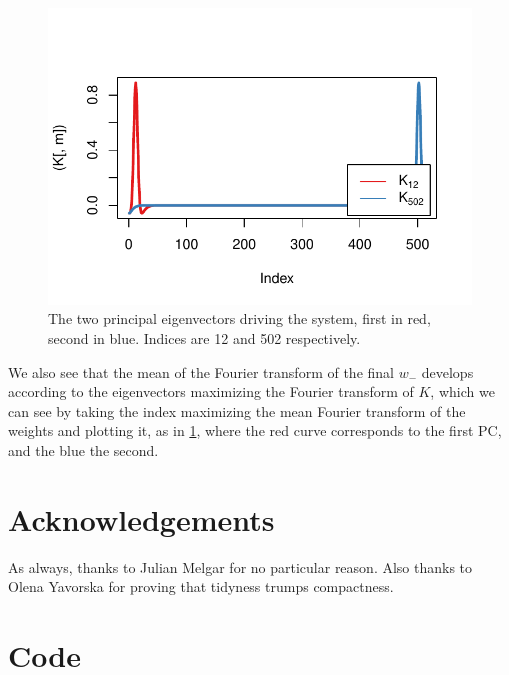 \documentclass[10pt]{article}\usepackage[]{graphicx}\usepackage[]{color}
\makeatletter
\def\maxwidth{ %
  \ifdim\Gin@nat@width>\linewidth
    \linewidth
  \else
    \Gin@nat@width
  \fi
}
\theoremstyle{plain}
\makeatother
\begin{document}
\begin{multicols*}{2}
\begin{Schunk}
\begin{figure}[H]

{\centering \includegraphics[width=\maxwidth]{../figures/twocolumn-4_max-1} 

}

\caption[The two principal eigenvectors driving the system, first in red, second in blue]{The two principal eigenvectors driving the system, first in red, second in blue. Indices are 12 and 502 respectively.}\label{fig:4_max}
\end{figure}
\end{Schunk}
We also see that the mean of the Fourier transform of the final $w_-$ develops according to the eigenvectors maximizing the Fourier transform of $K$, which we can see by taking the index maximizing the mean Fourier transform of the weights and plotting it, as in \cref{fig:4_max}, where the red curve corresponds to the first PC, and the blue the second.

\section{Acknowledgements}
As always, thanks to Julian Melgar for no particular reason. Also thanks to Olena Yavorska for proving that tidyness trumps compactness.

\end{multicols*}
\newpage
\onecolumn
  \appendix
\section{Code}
   
   
   
   
\end{document}
